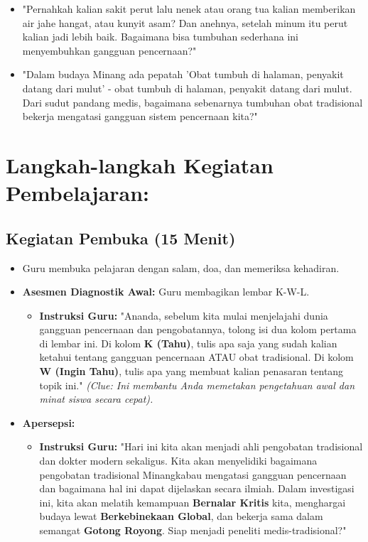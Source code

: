 \documentclass[a4paper,12pt]{article}
\begin{document}
\begin{itemize}
\item "Pernahkah kalian sakit perut lalu nenek atau orang tua kalian memberikan air jahe hangat, atau kunyit asam? Dan anehnya, setelah minum itu perut kalian jadi lebih baik. Bagaimana bisa tumbuhan sederhana ini menyembuhkan gangguan pencernaan?"
\item "Dalam budaya Minang ada pepatah 'Obat tumbuh di halaman, penyakit datang dari mulut' - obat tumbuh di halaman, penyakit datang dari mulut. Dari sudut pandang medis, bagaimana sebenarnya tumbuhan obat tradisional bekerja mengatasi gangguan sistem pencernaan kita?"
\end{itemize}

\section{Langkah-langkah Kegiatan Pembelajaran:}

\subsection{Kegiatan Pembuka (15 Menit)}
\begin{itemize}
\item Guru membuka pelajaran dengan salam, doa, dan memeriksa kehadiran.
\item \textbf{Asesmen Diagnostik Awal:} Guru membagikan lembar K-W-L.
    \begin{itemize}
    \item \textbf{Instruksi Guru:} "Ananda, sebelum kita mulai menjelajahi dunia gangguan pencernaan dan pengobatannya, tolong isi dua kolom pertama di lembar ini. Di kolom \textbf{K (Tahu)}, tulis apa saja yang sudah kalian ketahui tentang gangguan pencernaan ATAU obat tradisional. Di kolom \textbf{W (Ingin Tahu)}, tulis apa yang membuat kalian penasaran tentang topik ini." \textit{(Clue: Ini membantu Anda memetakan pengetahuan awal dan minat siswa secara cepat).}
    \end{itemize}
\item \textbf{Apersepsi:}
    \begin{itemize}
    \item \textbf{Instruksi Guru:} "Hari ini kita akan menjadi ahli pengobatan tradisional dan dokter modern sekaligus. Kita akan menyelidiki bagaimana pengobatan tradisional Minangkabau mengatasi gangguan pencernaan dan bagaimana hal ini dapat dijelaskan secara ilmiah. Dalam investigasi ini, kita akan melatih kemampuan \textbf{Bernalar Kritis} kita, menghargai budaya lewat \textbf{Berkebinekaan Global}, dan bekerja sama dalam semangat \textbf{Gotong Royong}. Siap menjadi peneliti medis-tradisional?"
    \end{itemize}
\end{itemize}
\end{document}
